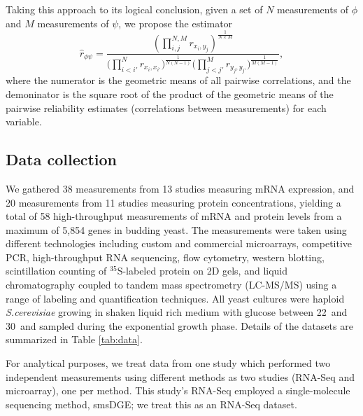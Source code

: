 \documentclass[10pt]{article}
\newcommand{\species}[1]{\textit{#1}}
\begin{document}
Taking this approach to its logical conclusion, given a set of $N$ measurements of $\phi$ and 
$M$ measurements of $\psi$, we propose the estimator 
\begin{equation*}
\hat{r}_{\phi \psi} = \frac{\left({\prod_{i,j}^{N,M}r_{x_i, y_j}}\right)^{\frac{1}{N\times M}}}{\bigg(\prod_{i<i'}^{N}r_{x_i,x_{i'}}\bigg)^{\frac{1}{N(N-1)}}\bigg(\prod_{j<j'}^{M}r_{y_j,y_{j'}}\bigg)^{\frac{1}{M(M-1)}}},
\end{equation*}
where the numerator is the geometric means of all pairwise correlations, and the demoninator is the square root of the product of the geometric means of the pairwise reliability estimates (correlations between measurements) for each variable.

\subsection*{Data collection}

We gathered 38 measurements from 13 studies measuring mRNA expression, and 20 measurements from 11 studies
measuring protein concentrations, yielding a total of
58 high-throughput measurements of mRNA and protein levels from a maximum of 5,854 genes 
in budding yeast. The measurements were taken using
different technologies including custom and commercial microarrays, competitive PCR,
high-throughput RNA sequencing, flow cytometry, western blotting, scintillation counting of $^{35}$S-labeled protein on 2D gels, and liquid chromatography coupled to tandem mass spectrometry (LC-MS/MS) using a range of labeling and quantification techniques. All yeast cultures
were haploid \species{S.cerevisiae} growing in shaken liquid rich medium with glucose 
between 22\celsius~and 30\celsius~and sampled during the exponential growth
phase. Details of the datasets are summarized in Table \ref{tab:data}.

For analytical purposes, we treat data from one study \cite{lipson09} which performed two independent measurements using different methods as two studies (RNA-Seq and microarray), one per method. This study's RNA-Seq employed a single-molecule sequencing method, smsDGE; we treat this as an RNA-Seq dataset.
\end{document}
